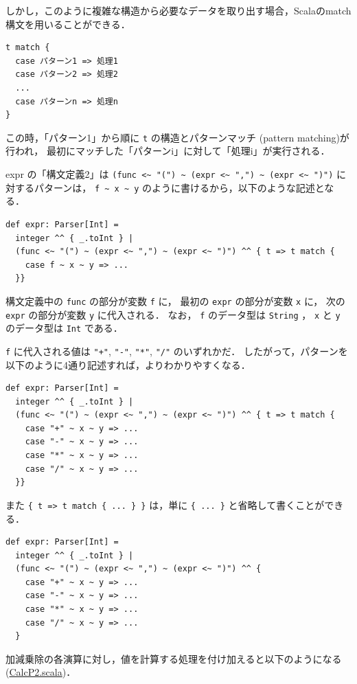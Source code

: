 \documentclass[a4j]{jsarticle}
\begin{document}
しかし，このように複雑な構造から必要なデータを取り出す場合，Scalaのmatch構文を用いることができる．

\begin{verbatim}
t match {
  case パターン1 => 処理1
  case パターン2 => 処理2
  ...
  case パターンn => 処理n
}
\end{verbatim}
この時，「パターン1」から順に \texttt{t} の構造とパターンマッチ (pattern matching)が行われ，
最初にマッチした「パターンi」に対して「処理i」が実行される．

expr の「構文定義2」は \texttt{(func <\textasciitilde{} "(") \textasciitilde{} (expr <\textasciitilde{} ",") \textasciitilde{} (expr <\textasciitilde{} ")")} に対するパターンは，
\texttt{f \textasciitilde{} x \textasciitilde{} y} のように書けるから，以下のような記述となる．

\begin{verbatim}
def expr: Parser[Int] =
  integer ^^ { _.toInt } |
  (func <~ "(") ~ (expr <~ ",") ~ (expr <~ ")") ^^ { t => t match {
    case f ~ x ~ y => ...
  }}
\end{verbatim}
構文定義中の \texttt{func} の部分が変数 \texttt{f} に， 
最初の \texttt{expr} の部分が変数 \texttt{x} に，
次の \texttt{expr} の部分が変数 \texttt{y} に代入される．
なお， \texttt{f} のデータ型は \texttt{String} ， \texttt{x} と \texttt{y} のデータ型は \texttt{Int} である．

\texttt{f} に代入される値は \texttt{"+"}, \texttt{"-"}, \texttt{"*"}, \texttt{"/"} のいずれかだ．
したがって，パターンを以下のように4通り記述すれば，よりわかりやすくなる．

\begin{verbatim}
def expr: Parser[Int] =
  integer ^^ { _.toInt } |
  (func <~ "(") ~ (expr <~ ",") ~ (expr <~ ")") ^^ { t => t match {
    case "+" ~ x ~ y => ...
    case "-" ~ x ~ y => ...
    case "*" ~ x ~ y => ...
    case "/" ~ x ~ y => ...
  }}
\end{verbatim}

また \texttt{\{ t => t match \{ ... \} \}} は，単に \texttt{\{ ... \}} と省略して書くことができる．

\begin{verbatim}
def expr: Parser[Int] =
  integer ^^ { _.toInt } |
  (func <~ "(") ~ (expr <~ ",") ~ (expr <~ ")") ^^ {
    case "+" ~ x ~ y => ...
    case "-" ~ x ~ y => ...
    case "*" ~ x ~ y => ...
    case "/" ~ x ~ y => ...
  }
\end{verbatim}

加減乗除の各演算に対し，値を計算する処理を付け加えると以下のようになる
(\href{file:///home/tamura/lect2/ProLang/2018/org/prog/parser/CalcP2.scala}{CalcP2.scala})．
\end{document}
